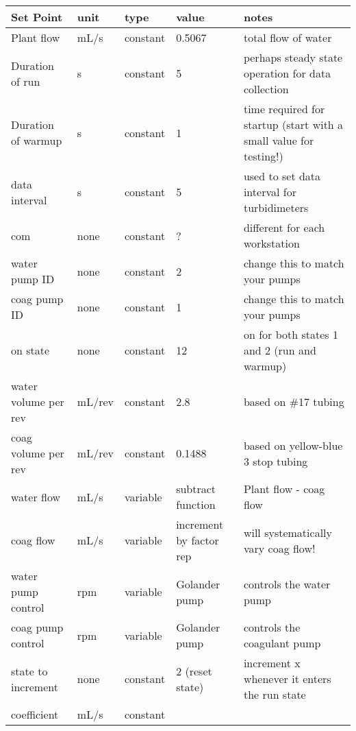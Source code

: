 \documentclass[letterpaper,10pt,english]{sphinxmanual}
\begin{document}
\begin{savenotes}\sphinxattablestart
\centering
{}
\label{\detokenize{ProCoDA/ProCoDA:id14}}\label{\detokenize{ProCoDA/ProCoDA:table-procoda-tutorial-method}}
\sphinxaftercaption
\begin{tabulary}{\linewidth}[t]{|T|T|T|T|T|}
\hline
\sphinxstyletheadfamily 
Set Point
&\sphinxstyletheadfamily 
unit
&\sphinxstyletheadfamily 
type
&\sphinxstyletheadfamily 
value
&\sphinxstyletheadfamily 
notes
\\
\hline
Plant flow
&
mL/s
&
constant
&
0.5067
&
total flow of water
\\
\hline
Duration of run
&
s
&
constant
&
5
&
perhaps steady state operation for data collection
\\
\hline
Duration of warmup
&
s
&
constant
&
1
&
time required for startup (start with a small value for testing!)
\\
\hline
data interval
&
s
&
constant
&
5
&
used to set data interval for turbidimeters
\\
\hline
com
&
none
&
constant
&
?
&
different for each workstation
\\
\hline
water pump ID
&
none
&
constant
&
2
&
change this to match your pumps
\\
\hline
coag pump ID
&
none
&
constant
&
1
&
change this to match your pumps
\\
\hline
on state
&
none
&
constant
&
12
&
on for both states 1 and 2 (run and warmup)
\\
\hline
water volume per rev
&
mL/rev
&
constant
&
2.8
&
based on \#17 tubing
\\
\hline
coag volume per rev
&
mL/rev
&
constant
&
0.1488
&
based on yellow-blue 3 stop tubing
\\
\hline
water flow
&
mL/s
&
variable
&
subtract function
&
Plant flow - coag flow
\\
\hline
coag flow
&
mL/s
&
variable
&
increment by factor rep
&
will systematically vary coag flow!
\\
\hline
water pump control
&
rpm
&
variable
&
Golander pump
&
controls the water pump
\\
\hline
coag pump control
&
rpm
&
variable
&
Golander pump
&
controls the coagulant pump
\\
\hline
state to increment
&
none
&
constant
&
2 (reset state)
&
increment x whenever it enters the run state
\\
\hline
coefficient
&
mL/s
&
constant

\end{tabulary}
\end{savenotes}
\end{document}
